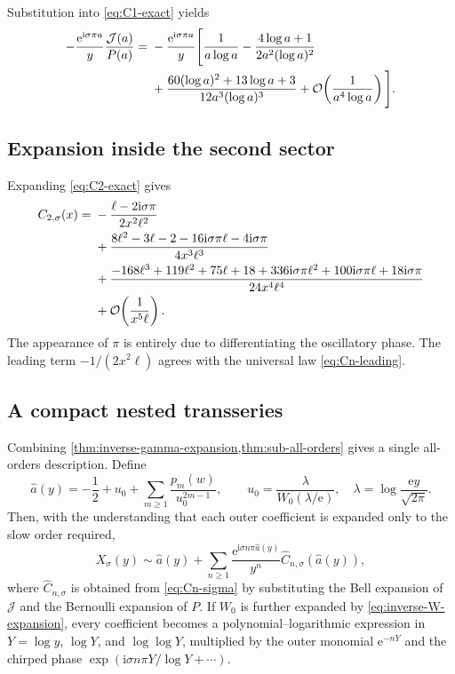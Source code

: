 \documentclass[11pt,a4paper]{article}
\numberwithin{equation}{section}
\theoremstyle{definition}
\theoremstyle{remark}
\newcommand{\e}{\mathrm e}
\newcommand{\ii}{\mathrm i}
\newcommand{\Ord}{\mathcal O}
\newcommand{\Tail}{\mathcal J}
\begin{document}
Substitution into \eqref{eq:C1-exact} yields
\begin{align}
-\frac{\e^{\ii\sigma\pi a}}{y}\frac{\Tail(a)}{P(a)}
={}&-\frac{\e^{\ii\sigma\pi a}}{y}
\Bigg[
 \frac1{a\log a}
 -\frac{4\log a+1}{2a^2(\log a)^2}\notag\\
&+\frac{60(\log a)^2+13\log a+3}
 {12a^3(\log a)^3}
 +\Ord\!\left(\frac1{a^4\log a}\right)
\Bigg].
\label{eq:first-sector-expanded}
\end{align}

\subsection{Expansion inside the second sector}

Expanding \eqref{eq:C2-exact} gives
\begin{align}
 C_{2,\sigma}(x)={}&
 -\frac{\ell-2\ii\sigma\pi}{2x^2\ell^2}\notag\\
&+\frac{8\ell^2-3\ell-2-16\ii\sigma\pi\ell-4\ii\sigma\pi}
 {4x^3\ell^3}\notag\\
&+\frac{-168\ell^3+119\ell^2+75\ell+18
 +336\ii\sigma\pi\ell^2+100\ii\sigma\pi\ell+18\ii\sigma\pi}
 {24x^4\ell^4}\notag\\
&+\Ord\!\left(\frac1{x^5\ell}\right).
\label{eq:C2-expanded}
\end{align}
The appearance of $\pi$ is entirely due to differentiating the oscillatory
phase.  The leading term $-1/(2x^2\ell)$ agrees with the universal law
\eqref{eq:Cn-leading}.

\subsection{A compact nested transseries}

Combining \cref{thm:inverse-gamma-expansion,thm:sub-all-orders} gives a
single all-orders description.  Define
\begin{equation}\label{eq:a-tilde-formal}
 \widehat a(y)=-\frac12+u_0+
 \sum_{m\ge1}\frac{p_m(w)}{u_0^{2m-1}},
 \qquad
 u_0=\frac{\lambda}{W_0(\lambda/\e)},
 \quad \lambda=\log\frac{\e y}{\sqrt{2\pi}}.
\end{equation}
Then, with the understanding that each outer coefficient is expanded only
to the slow order required,
\begin{equation}\label{eq:full-nested-transseries}
 \boxed{\quad
 X_\sigma(y)\sim\widehat a(y)
 +\sum_{n\ge1}\frac{\e^{\ii\sigma n\pi\widehat a(y)}}{y^n}
 \widehat C_{n,\sigma}(\widehat a(y)),
 \quad}
\end{equation}
where $\widehat C_{n,\sigma}$ is obtained from \eqref{eq:Cn-sigma} by
substituting the Bell expansion of $\Tail$ and the Bernoulli expansion of
$P$.  If $W_0$ is further expanded by \eqref{eq:inverse-W-expansion}, every
coefficient becomes a polynomial--logarithmic expression in
$Y=\log y$, $\log Y$, and $\log\log Y$, multiplied by the outer monomial
$\e^{-nY}$ and the chirped phase
$\exp(\ii\sigma n\pi Y/\log Y+\cdots)$.
\end{document}
